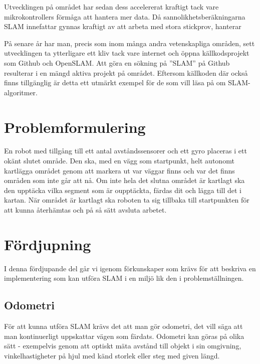 \documentclass[a4paper,12pt,fleqn]{article}
\begin{document}
Utvecklingen på området har sedan dess accelererat kraftigt tack vare
mikrokontrollers förmåga att hantera mer data. Då sannolikhetsberäkningarna SLAM innefattar gynnas kraftigt av att arbeta
med stora stickprov, hanterar 

På senare år har man, precis som inom många andra vetenskapliga områden, sett utvecklingen ta ytterligare ett kliv tack vare internet och öppna källkodsprojekt som Github och OpenSLAM. Att göra en sökning på ''SLAM'' på Github resulterar i en mängd aktiva projekt på området. Eftersom källkoden där också finns tillgänglig är detta ett utmärkt exempel för de som vill läsa på om SLAM-algoritmer. 


\section{Problemformulering}

En robot med tillgång till ett antal avståndssensorer och ett gyro placeras i ett okänt slutet område. Den ska, med en vägg som startpunkt, helt autonomt kartlägga området genom att markera ut var väggar finns och var det finns områden som inte går att nå. Om inte hela det slutna området är kartlagt ska den upptäcka vilka segment som är oupptäckta, färdas dit och lägga till det i kartan. När området är kartlagt ska roboten ta sig tillbaka till startpunkten för att kunna återhämtas och på så sätt avsluta arbetet. 


\newpage
\section{Fördjupning}
I denna fördjupande del går vi igenom förkunskaper som krävs för att beskriva en implementering som kan utföra SLAM i en miljö lik den i problemställningen. 

\subsection{Odometri}

För att kunna utföra SLAM krävs det att man gör odometri, det vill säga att man kontinuerligt uppskattar vägen som färdats. Odometri kan göras på olika sätt - exempelvis genom att optiskt mäta avstånd till objekt i sin omgivning, vinkelhastigheter på hjul med känd storlek eller steg med given längd. 
\end{document}
